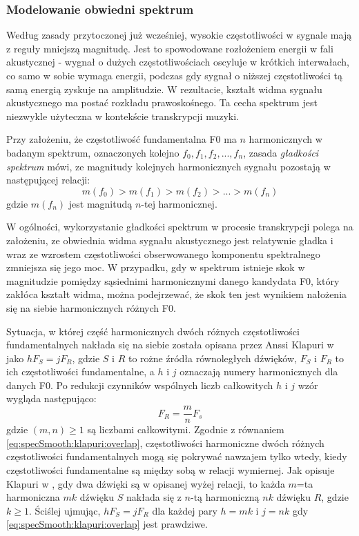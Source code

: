 \documentclass[12pt,a4paper,twoside]{mwart}
\begin{document}
\subsubsection{Modelowanie obwiedni spektrum}\label{sec:specSmoothnes}
Według zasady przytoczonej już wcześniej, wysokie częstotliwości w sygnale mają z reguły mniejszą magnitudę. Jest to spowodowane rozłożeniem energii w fali akustycznej - wygnał o dużych częstotliwościach oscyluje w krótkich interwałach, co samo w sobie wymaga energii, podczas gdy sygnał o niższej częstotliwości tą samą energią zyskuje na amplitudzie. W rezultacie, kształt widma sygnału akustycznego ma postać rozkładu prawoskośnego. Ta cecha spektrum jest niezwykle użyteczna w kontekście transkrypcji muzyki.

Przy założeniu, że częstotliwość fundamentalna F0 ma $n$ harmonicznych w badanym spektrum, oznaczonych kolejno $f_0, f_1, f_2, ..., f_n$, zasada \textit{gładkości spektrum} mówi, ze magnitudy kolejnych harmonicznych sygnału pozostają w następującej relacji:
\begin{equation}\label{eq:specSmooth:principle}
  m(f_0) > m(f_1) > m(f_2) > ... > m(f_n)
\end{equation}
gdzie $m(f_n)$ jest magnitudą $n$-tej harmonicznej.

W ogólności, wykorzystanie gładkości spektrum w procesie transkrypcji polega na założeniu, ze obwiednia widma sygnału akustycznego jest relatywnie gładka i wraz ze wzrostem częstotliwości obserwowanego komponentu spektralnego zmniejsza się jego moc. W przypadku, gdy w spektrum istnieje skok w magnitudzie pomiędzy sąsiednimi harmonicznymi danego kandydata F0, który zakłóca kształt widma, można podejrzewać, że skok ten jest wynikiem nałożenia się na siebie harmonicznych różnych F0.


Sytuacja, w której część harmonicznych dwóch różnych częstotliwości fundamentalnych nakłada się na siebie została opisana przez Anssi Klapuri w \cite[3382]{Transcription:Klapuri:MultipitchEstimationAndSeparation} jako $hF_S = jF_R$, gdzie $S$ i $R$ to rożne źródła równoległych dźwięków, $F_S$ i $F_R$ to ich częstotliwości fundamentalne, a $h$ i $j$ oznaczają numery harmonicznych dla danych F0. Po redukcji czynników wspólnych liczb całkowitych $h$ i $j$ wzór wygląda następująco:
\begin{equation}\label{eq:specSmooth:klapuri:overlap}
  F_R = \frac{m}{n}F_s
\end{equation}
gdzie $(m, n) \geqslant 1$ są liczbami całkowitymi. Zgodnie z równaniem \ref{eq:specSmooth:klapuri:overlap}, częstotliwości harmoniczne dwóch różnych częstotliwości fundamentalnych mogą się pokrywać nawzajem tylko wtedy, kiedy częstotliwości fundamentalne są między sobą w relacji wymiernej. Jak opisuje Klapuri w \cite[3382]{Transcription:Klapuri:MultipitchEstimationAndSeparation}, gdy dwa dźwięki są w opisanej wyżej relacji, to każda $m$=ta harmoniczna $mk$ dźwięku $S$ nakłada się z $n$-tą harmoniczną $nk$ dźwięku $R$, gdzie $k \geqslant 1$. Ściślej ujmując, $hF_S = jF_R$ dla każdej pary $h=mk$ i $j=nk$ gdy \ref{eq:specSmooth:klapuri:overlap} jest prawdziwe.
\end{document}
